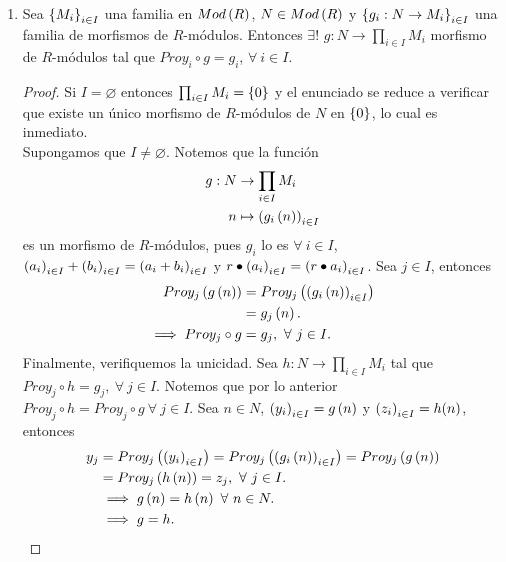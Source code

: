 \documentclass{article}
\begin{document}
\begin{enumerate}[label=\textbf{Ej \arabic*.}]
		
		\item Sea ${\left\{{M}_{i}\right\}}_{i\in I}$ una familia en $Mod\left(R\right)$, $N\in Mod\left(R\right)$ y $\left\{g_i:N\to M_i\right\}_{i\in I}$ una familia de morfismos de $R$-módulos. Entonces $\exists !$ $g:N\to\prod_{i\in I}M_i$ morfismo de $R$-módulos  tal que $Proy_i\circ g=g_i$, $\forall\ i\in I$.
		\begin{proof}
			Si $I=\varnothing$ entonces $\prod_{i\in I}M_i=\left\{0\right\}$ y el enunciado se reduce a verificar que existe un único morfismo de $R$-módulos de $N$ en $\left\{0\right\}$, lo cual es inmediato.\\
			Supongamos que $I\neq\varnothing$. Notemos que la función
			\begin{align*}
				g: N &\rightarrow \prod_{i\in I}M_i\\ n &\mapsto \left(g_i\left(n\right)\right)_{i\in I}
			\end{align*}
			es un morfismo de $R$-módulos, pues $g_i$ lo es $\forall\ i\in I$, ${\left({a}_{i}\right)}_{i\in I}+{\left({b}_{i}\right)}_{i\in I}=\left(a_i+b_i\right)_{i\in I}$ y $r\bullet{\left({a}_{i}\right)}_{i\in I}=\left(r\bullet a_i\right)_{i\in I}$. Sea $j\in I$, entonces
			\begin{align*}
				Proy_j\left(g\left(n\right)\right)&=Proy_j\left(\left(g_i\left(n\right)\right)_{i\in I}\right)\\
				&=g_j\left(n\right).\\
				\implies Proy_j\circ g&=g_j,\ \forall\ j\in I.
			\end{align*}
			Finalmente, verifiquemos la unicidad. Sea $h:N\to\prod_{i\in I}M_i$ tal que $Proy_j\circ h=g_j,\ \forall\ j\in I$. Notemos que por lo anterior $Proy_j\circ h=Proy_j\circ g\ \forall\ j\in I$. Sea $n\in N$, ${\left({y}_{i}\right)}_{i\in I}=g\left(n\right)$ y ${\left({z}_{i}\right)}_{i\in I}=h(n)$, entonces
			\begin{align*}
				y_j&=Proy_j\left({\left({y}_{i}\right)}_{i\in I}\right)=Proy_j\left(\left(g_i\left(n\right)\right)_{i\in I}\right)=Proy_j\left(g\left(n\right)\right)\\
				&=Proy_j\left(h\left(n\right)\right)= z_j,\ \forall\ j\in I.\\
				&\implies g\left(n\right)=h\left(n\right)\ \forall\ n\in N.\\
				&\implies g=h.
			\end{align*}
		\end{proof}
		

\end{enumerate}
\end{document}
